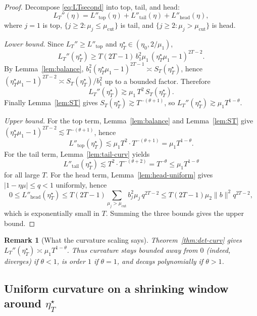 \documentclass[11pt]{article}
\newtheorem{remark}{Remark}
\begin{document}
\begin{proof}
Decompose \eqref{eq:LTsecond} into top, tail, and head:
\[
L_T''(\eta)=L''_{\mathrm{top}}(\eta)+L''_{\mathrm{tail}}(\eta)+L''_{\mathrm{head}}(\eta),
\]
where $j=1$ is top, $\{j\ge2:\mu_j\le \mu_{\mathrm{cut}}\}$ is tail, and $\{j\ge2:\mu_j>\mu_{\mathrm{cut}}\}$ is head.

\emph{Lower bound.}
Since $L_T''\ge L''_{\mathrm{top}}$ and $\eta_T^\star\in(\eta_0,2/\mu_1)$,
\[
L_T''(\eta_T^\star)
\ge
T(2T-1)\,b_1^2\mu_1\,(\eta_T^\star\mu_1-1)^{2T-2}.
\]
By Lemma~\ref{lem:balance},
$b_1^2(\eta_T^\star\mu_1-1)^{2T-1}\asymp S_T(\eta_T^\star)$, hence
$(\eta_T^\star\mu_1-1)^{2T-2}\asymp S_T(\eta_T^\star)/b_1^2$ up to a bounded factor.
Therefore
\[
L_T''(\eta_T^\star)\gtrsim \mu_1\,T^2\,S_T(\eta_T^\star).
\]
Finally Lemma~\ref{lem:ST} gives $S_T(\eta_T^\star)\gtrsim T^{-(\theta+1)}$, so
$L_T''(\eta_T^\star)\gtrsim \mu_1 T^{1-\theta}$.

\emph{Upper bound.}
For the top term, Lemma~\ref{lem:balance} and Lemma~\ref{lem:ST} give
$(\eta_T^\star\mu_1-1)^{2T-2}\lesssim T^{-(\theta+1)}$, hence
\[
L''_{\mathrm{top}}(\eta_T^\star)\lesssim \mu_1 T^2\cdot T^{-(\theta+1)}=\mu_1 T^{1-\theta}.
\]
For the tail term, Lemma~\ref{lem:tail-curv} yields
\[
L''_{\mathrm{tail}}(\eta_T^\star)
\lesssim
T^2\cdot T^{-(\theta+2)}=T^{-\theta}\le \mu_1 T^{1-\theta}
\]
for all large $T$. For the head term, Lemma~\ref{lem:head-uniform} gives $|1-\eta\mu|\le q<1$ uniformly, hence
\[
0\le L''_{\mathrm{head}}(\eta_T^\star)
\le
T(2T-1)\sum_{\mu_j>\mu_{\mathrm{cut}}} b_j^2\mu_j\,q^{2T-2}
\le
T(2T-1)\mu_2\|b\|^2 q^{2T-2},
\]
which is exponentially small in $T$. Summing the three bounds gives the upper bound.
\end{proof}

\begin{remark}[What the curvature scaling says]
Theorem~\ref{thm:det-curv} gives $L_T''(\eta_T^\star)\asymp \mu_1 T^{1-\theta}$.
Thus curvature stays bounded away from $0$ (indeed, diverges) if $\theta<1$, is order $1$ if
$\theta=1$, and decays polynomially if $\theta>1$.
\end{remark}

\subsection{Uniform curvature on a shrinking window around $\eta_T^\star$}
\end{document}
